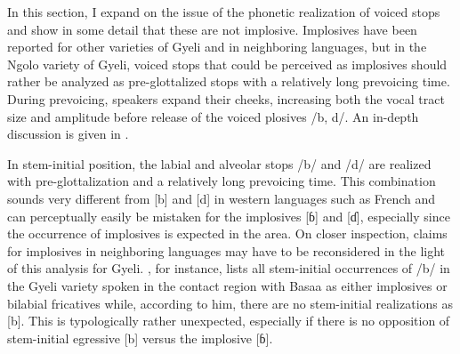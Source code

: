 In this section, I expand on the issue of the phonetic realization of voiced stops and show in some detail that these are not implosive. Implosives have been reported for other varieties of Gyeli and in neighboring languages, but in the Ngolo variety of Gyeli, voiced stops that could be perceived as implosives should rather be analyzed as pre-glottalized stops with a relatively long prevoicing time.                                                                                                                                                                                                                                                                                                                                                                                                                            During prevoicing, speakers expand their cheeks, increasing both the vocal tract size and amplitude before release of the voiced plosives /b, d/.  An in-depth discussion is given in \citet{grimm2019}.

In stem-initial position, the labial and alveolar stops /b/ and /d/ are realized with pre-glottalization and a relatively long prevoicing time. This combination sounds very different from [b] and [d] in western languages such as French and can perceptually easily be mistaken for the implosives [ɓ] and [ɗ], especially since the occurrence of implosives is expected in the area.  On closer inspection, claims for implosives in neighboring languages may have to be reconsidered in the light of this analysis for Gyeli.
\citet{ngueum2012}, for instance, lists all stem-initial occurrences of /b/ in the Gyeli variety spoken in the contact region with Basaa as either implosives or bilabial fricatives while, according to him, there are no stem-initial realizations as [b]. This is typologically rather unexpected, especially if there is no opposition of stem-initial egressive [b] versus the implosive [ɓ].


